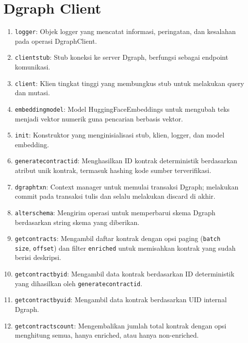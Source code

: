 \chapter{Dgraph Client}
\label{appendix:dgraph-client}

\begin{enumerate}
    \item \texttt{logger}: Objek logger yang mencatat informasi, peringatan, dan kesalahan pada operasi DgraphClient.
    \item \texttt{client\textunderscore stub}: Stub koneksi ke server Dgraph, berfungsi sebagai endpoint komunikasi.
    \item \texttt{client}: Klien tingkat tinggi yang membungkus stub untuk melakukan query dan mutasi.
    \item \texttt{embedding\textunderscore model}: Model HuggingFaceEmbeddings untuk mengubah teks menjadi vektor numerik guna pencarian berbasis vektor.
    \item \texttt{\textunderscore init\textunderscore }: Konstruktor yang menginisialisasi stub, klien, logger, dan model embedding.
    \item \texttt{generate\textunderscore contract\textunderscore id}: Menghasilkan ID kontrak deterministik berdasarkan atribut unik kontrak, termasuk hashing kode sumber terverifikasi.
    \item \texttt{dgraph\textunderscore txn}: Context manager untuk memulai transaksi Dgraph; melakukan commit pada transaksi tulis dan selalu melakukan discard di akhir.
    \item \texttt{alter\textunderscore schema}: Mengirim operasi untuk memperbarui skema Dgraph berdasarkan string skema yang diberikan.
    \item \texttt{get\textunderscore contracts}: Mengambil daftar kontrak dengan opsi paging (\texttt{batch\textunderscore \\size}, \texttt{offset}) dan filter \texttt{enriched} untuk memisahkan kontrak yang sudah berisi deskripsi.
    \item \texttt{get\textunderscore contract\textunderscore by\textunderscore id}: Mengambil data kontrak berdasarkan ID deterministik yang dihasilkan oleh \texttt{generate\textunderscore contract\textunderscore id}.
    \item \texttt{get\textunderscore contract\textunderscore by\textunderscore uid}: Mengambil data kontrak berdasarkan UID internal Dgraph.
    \item \texttt{get\textunderscore contracts\textunderscore count}: Mengembalikan jumlah total kontrak dengan opsi menghitung semua, hanya enriched, atau hanya non-enriched.

\end{enumerate}
